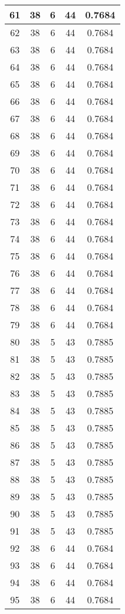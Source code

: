 \documentclass[letterpaper, 12pt]{article}
\begin{document}
\begin{longtable}{|c|c|c|c|c|}
61 & 38 & 6 & 44 & 0.7684 \\
\hline
62 & 38 & 6 & 44 & 0.7684 \\
\hline
63 & 38 & 6 & 44 & 0.7684 \\
\hline
64 & 38 & 6 & 44 & 0.7684 \\
\hline
65 & 38 & 6 & 44 & 0.7684 \\
\hline
66 & 38 & 6 & 44 & 0.7684 \\
\hline
67 & 38 & 6 & 44 & 0.7684 \\
\hline
68 & 38 & 6 & 44 & 0.7684 \\
\hline
69 & 38 & 6 & 44 & 0.7684 \\
\hline
70 & 38 & 6 & 44 & 0.7684 \\
\hline
71 & 38 & 6 & 44 & 0.7684 \\
\hline
72 & 38 & 6 & 44 & 0.7684 \\
\hline
73 & 38 & 6 & 44 & 0.7684 \\
\hline
74 & 38 & 6 & 44 & 0.7684 \\
\hline
75 & 38 & 6 & 44 & 0.7684 \\
\hline
76 & 38 & 6 & 44 & 0.7684 \\
\hline
77 & 38 & 6 & 44 & 0.7684 \\
\hline
78 & 38 & 6 & 44 & 0.7684 \\
\hline
79 & 38 & 6 & 44 & 0.7684 \\
\hline
80 & 38 & 5 & 43 & 0.7885 \\
\hline
81 & 38 & 5 & 43 & 0.7885 \\
\hline
82 & 38 & 5 & 43 & 0.7885 \\
\hline
83 & 38 & 5 & 43 & 0.7885 \\
\hline
84 & 38 & 5 & 43 & 0.7885 \\
\hline
85 & 38 & 5 & 43 & 0.7885 \\
\hline
86 & 38 & 5 & 43 & 0.7885 \\
\hline
87 & 38 & 5 & 43 & 0.7885 \\
\hline
88 & 38 & 5 & 43 & 0.7885 \\
\hline
89 & 38 & 5 & 43 & 0.7885 \\
\hline
90 & 38 & 5 & 43 & 0.7885 \\
\hline
91 & 38 & 5 & 43 & 0.7885 \\
\hline
92 & 38 & 6 & 44 & 0.7684 \\
\hline
93 & 38 & 6 & 44 & 0.7684 \\
\hline
94 & 38 & 6 & 44 & 0.7684 \\
\hline
95 & 38 & 6 & 44 & 0.7684 \\

\end{longtable}
\end{document}
